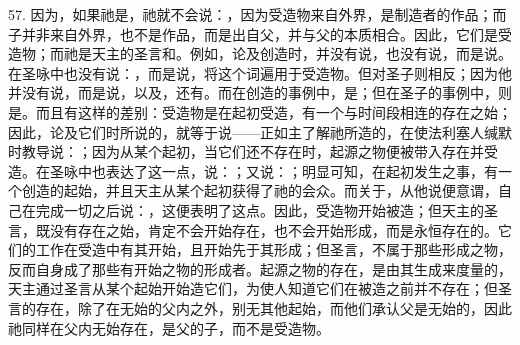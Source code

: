 57. 因为，如果祂是，祂就不会说：，因为受造物来自外界，是制造者的作品；而子并非来自外界，也不是作品，而是出自父，并与父的本质相合。因此，它们是受造物；而祂是天主的圣言和。例如，论及创造时，并没有说，也没有说，而是说。在圣咏中也没有说：，而是说，将这个词遍用于受造物。但对圣子则相反；因为他并没有说，而是说，以及，还有。而在创造的事例中，是；但在圣子的事例中，则是。而且有这样的差别：受造物是在起初受造，有一个与时间段相连的存在之始；因此，论及它们时所说的，就等于说——正如主了解祂所造的，在使法利塞人缄默时教导说：；因为从某个起初，当它们还不存在时，起源之物便被带入存在并受造。在圣咏中也表达了这一点，说：；又说：；明显可知，在起初发生之事，有一个创造的起始，并且天主从某个起初获得了祂的会众。而关于，从他说便意谓，自己在完成一切之后说：，这便表明了这点。因此，受造物开始被造；但天主的圣言，既没有存在之始，肯定不会开始存在，也不会开始形成，而是永恒存在的。它们的工作在受造中有其开始，且开始先于其形成；但圣言，不属于那些形成之物，反而自身成了那些有开始之物的形成者。起源之物的存在，是由其生成来度量的，天主通过圣言从某个起始开始造它们，为使人知道它们在被造之前并不存在；但圣言的存在，除了在无始的父内之外，别无其他起始，而他们承认父是无始的，因此祂同样在父内无始存在，是父的子，而不是受造物。\par

